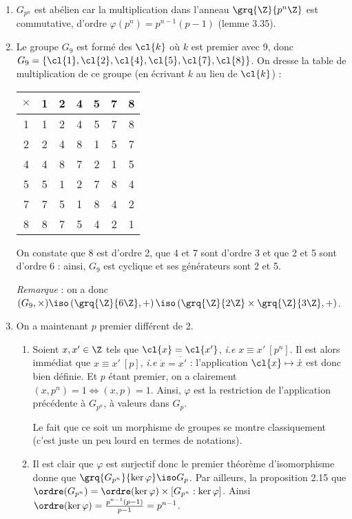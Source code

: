 \begin{enumerate}
 \item $G_{p^n}$ est abélien car la multiplication dans l'anneau $\grq{\Z}{p^n\Z}$ est commutative, d'ordre $\varphi(p^n) = p^{n-1}(p-1)$ (lemme 3.35).
 \item Le groupe $G_9$ est formé des $\cl{k}$ où $k$ est premier avec 9, donc $G_9 =\{\cl{1},\cl{2},\cl{4},\cl{5},\cl{7},\cl{8}\}$. On dresse la table de multiplication de ce groupe (en écrivant $k$ au lieu de $\cl{k}$) :

 \begin{center}
  \begin{tabular}{c|cccccc}
    $\times$   & 1 & 2 & 4 &  5 &   7 &   8 \\
    \midrule
           1 & 1 & 2 & 4 &   5 &   7 &   8 \\
    2 & 2 & 4 & 8 &   1 &   5 &   7 \\
    4 & 4 & 8 & 7 & 2 & 1 & 5 \\
      5 &  5 &  1 &  2 &  7 & 8 & 4 \\
      7 & 7 &  5 &  1 & 8 & 4 & 2 \\
      8 &   8 &   7 &  5 & 4 & 2 &  1 \\
  \end{tabular}
\end{center}
On constate que 8 est d'ordre 2, que 4 et 7 sont d'ordre 3 et que 2 et 5 sont d'ordre 6 : ainsi, $G_9$ est cyclique et ses générateurs sont 2 et 5.

\emph{Remarque} : on a donc $(G_9,\times) \iso \left( \grq{\Z}{6\Z}, +\right)\iso \left( \grq{\Z}{2\Z}\times\grq{\Z}{3\Z} , +\right)$.

\item On a maintenant $p$ premier différent de 2.

\begin{enumerate}
 \item Soient $x,x' \in \Z$ tels que $\cl{x} = \cl{x'}$, \textit{i.e} $x\equiv x' ~[p^n]$. Il est alors immédiat que $x\equiv x' ~[p]$, \textit{i.e} $\dot{x} = \dot{x'}$ : l'application $\cl{x} \mapsto \dot{x}$ est donc bien définie. Et $p$ étant premier, on a clairement $(x,p^n)=1 \iff (x, p) = 1$. Ainsi, $\varphi$ est la restriction de l'application précédente à $G_{p^n}$, à valeurs dans $G_p$.

 Le fait que ce soit un morphisme de groupes se montre classiquement (c'est juste un peu lourd en termes de notations).

 \item Il est clair que $\varphi$ est surjectif donc le premier théorème d'isomorphisme donne que $\grq{G_{p^n}}{\ker \varphi} \iso G_p$. Par ailleurs, la proposition 2.15 que $\ordre(G_{p^n}) = \ordre(\ker \varphi) \times [G_{p^n}:\ker \varphi ]$. Ainsi $\ordre(\ker \varphi) = \frac{p^{n-1}(p-1)}{p-1} = p^{n-1}$.


\end{enumerate}
\end{enumerate}
